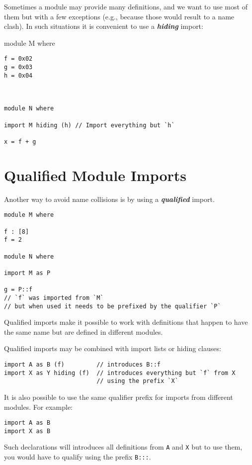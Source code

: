 Sometimes a module may provide many definitions, and we want to use most
of them but with a few exceptions (e.g., because those would result to a
name clash). In such situations it is convenient to use a
\textbf{\emph{hiding}} import:

module M where

\begin{verbatim}
f = 0x02
g = 0x03
h = 0x04



module N where

import M hiding (h) // Import everything but `h`

x = f + g
\end{verbatim}

\section{Qualified Module Imports}\label{qualified-module-imports}

Another way to avoid name collisions is by using a
\textbf{\emph{qualified}} import.

\begin{verbatim}
module M where

f : [8]
f = 2

module N where

import M as P

g = P::f
// `f` was imported from `M`
// but when used it needs to be prefixed by the qualifier `P`
\end{verbatim}

Qualified imports make it possible to work with definitions that happen
to have the same name but are defined in different modules.

Qualified imports may be combined with import lists or hiding clauses:

\begin{verbatim}
import A as B (f)         // introduces B::f
import X as Y hiding (f)  // introduces everything but `f` from X
                          // using the prefix `X`
\end{verbatim}

It is also possible to use the same qualifier prefix for imports from
different modules. For example:

\begin{verbatim}
import A as B
import X as B
\end{verbatim}

Such declarations will introduces all definitions from \texttt{A} and
\texttt{X} but to use them, you would have to qualify using the prefix
\texttt{B:::}.

